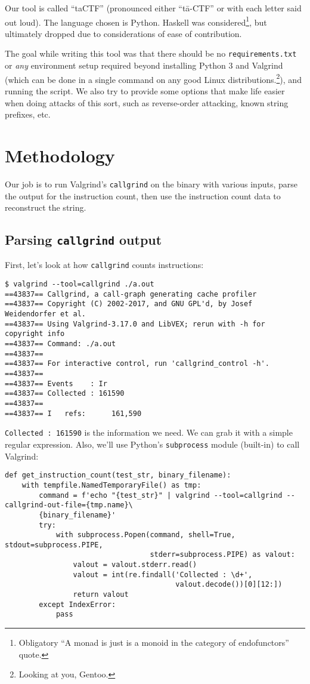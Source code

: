 \documentclass[11pt]{article}
\begin{document}
Our tool is called ``taCTF'' (pronounced either ``tā-CTF'' or with each
letter said out loud). The language chosen is Python. Haskell was
considered\footnote{Obligatory ``A monad is just is a monoid in the category of endofunctors'' quote.}, but ultimately dropped due to considerations of ease of
contribution.

The goal while writing this tool was that there should be no
\texttt{requirements.txt} or \emph{any} environment setup required beyond
installing Python 3 and Valgrind (which can be done in a single
command on any good Linux distributions.\footnote{Looking at you, Gentoo.}), and running the
script. We also try to provide some options that make life easier when
doing attacks of this sort, such as reverse-order attacking, known
string prefixes, etc.

\section{Methodology}
\label{sec:org63405e2}

Our job is to run Valgrind's \texttt{callgrind} on the binary with various
inputs, parse the output for the instruction count, then use the
instruction count data to reconstruct the string.

\subsection{Parsing \texttt{callgrind} output}
\label{sec:orge980608}

First, let's look at how \texttt{callgrind} counts instructions:

\begin{verbatim}
$ valgrind --tool=callgrind ./a.out
==43837== Callgrind, a call-graph generating cache profiler
==43837== Copyright (C) 2002-2017, and GNU GPL'd, by Josef Weidendorfer et al.
==43837== Using Valgrind-3.17.0 and LibVEX; rerun with -h for copyright info
==43837== Command: ./a.out
==43837==
==43837== For interactive control, run 'callgrind_control -h'.
==43837==
==43837== Events    : Ir
==43837== Collected : 161590
==43837==
==43837== I   refs:      161,590
\end{verbatim}

\texttt{Collected : 161590} is the information we need. We can grab it with a
simple regular expression. Also, we'll use Python's \texttt{subprocess}
module (built-in) to call Valgrind:
\begin{verbatim}
def get_instruction_count(test_str, binary_filename):
    with tempfile.NamedTemporaryFile() as tmp:
        command = f'echo "{test_str}" | valgrind --tool=callgrind --callgrind-out-file={tmp.name}\
        {binary_filename}'
        try:
            with subprocess.Popen(command, shell=True, stdout=subprocess.PIPE,
                                  stderr=subprocess.PIPE) as valout:
                valout = valout.stderr.read()
                valout = int(re.findall('Collected : \d+',
                                        valout.decode())[0][12:])
                return valout
        except IndexError:
            pass
\end{verbatim}
\end{document}

